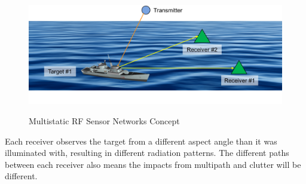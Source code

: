 \begin{figure}[H]
  \begin{center}
\includegraphics[width=5in]{../media/multistatic/ms_rf_concept.png}
  \end{center}
  \renewcommand{\baselinestretch}{1} \small\normalsize
  \begin{quote}
    \caption[Multistatic RF Sensor Networks Concept]{Multistatic RF Sensor Networks Concept\label{ms_fig:1}}
  \end{quote}
\end{figure}
\renewcommand{\baselinestretch}{2} \small\normalsize
Each receiver observes the target from a different aspect angle than it was illuminated with, resulting in different radiation patterns. The different paths between each receiver also means the impacts from multipath and clutter will be different.